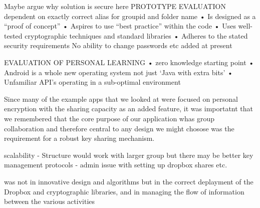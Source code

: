 Maybe argue why solution is secure here
PROTOTYPE EVALUATION
dependent on exactly correct alias for groupid and folder name
• Is designed as a “proof of concept”
• Aspires to use “best practice” within the code 
• Uses well-tested cryptographic techniques and standard libraries
• Adheres to the stated security requirements 
No ability to change passwords etc added at present

EVALUATION OF PERSONAL LEARNING 
• zero knowledge starting point 
• Android is a whole new operating system not just ‘Java with extra bits’
• Unfamiliar API’s operating in a sub-optimal environment 


Since many of the example apps that we looked at were focused on personal encryption with the sharing capacity as an added feature, it was importatnt that we remembered that the core purpose of our application whas group collaboration and therefore central to any design we might chosose was the requirement for a robust key sharing mechanism.

scalability - Structure would work with larger group but there may be better key management protocols - admin issue with setting up dropbox shares etc.

 was not in innovative design and algorithms but in the correct deplayment of the Dropbox and cryptographic libraries, and in managing the flow of information between the various activities